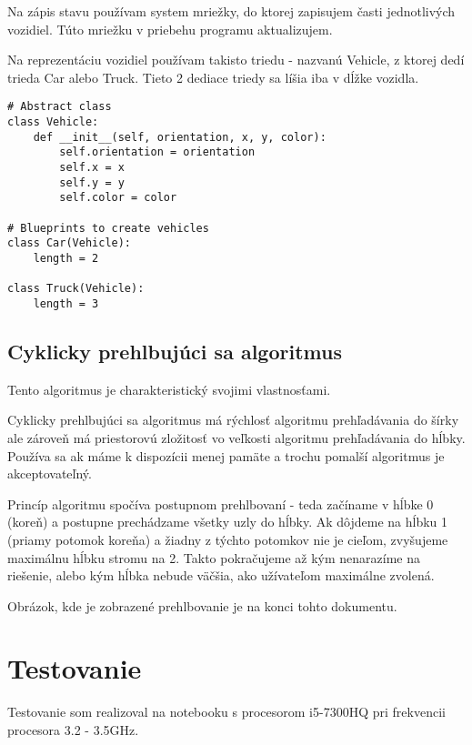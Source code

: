 \documentclass[10pt,oneside,slovak,a4paper]{article}
\begin{document}
Na zápis stavu používam system mriežky, do ktorej zapisujem časti jednotlivých vozidiel. Túto mriežku v priebehu programu aktualizujem.

\medskip

Na reprezentáciu vozidiel používam takisto triedu - nazvanú Vehicle, z ktorej dedí trieda Car alebo Truck. Tieto 2 dediace triedy sa líšia iba v dĺžke vozidla.

\begin{lstlisting}
# Abstract class
class Vehicle:
    def __init__(self, orientation, x, y, color):
        self.orientation = orientation
        self.x = x
        self.y = y
        self.color = color

# Blueprints to create vehicles
class Car(Vehicle):
    length = 2

class Truck(Vehicle):
    length = 3
\end{lstlisting}


\subsection{Cyklicky prehlbujúci sa algoritmus}

Tento algoritmus je charakteristický svojimi vlastnosťami.


Cyklicky prehlbujúci sa algoritmus má rýchlosť algoritmu prehľadávania do šírky ale zároveň má priestorovú zložitosť vo veľkosti algoritmu prehľadávania do hĺbky.
Používa sa ak máme k dispozícii menej pamäte a trochu pomalší algoritmus je akceptovateľný.

\medskip

Princíp algoritmu spočíva postupnom prehlbovaní - teda začíname v hĺbke 0 (koreň) a postupne prechádzame všetky uzly do hĺbky. Ak dôjdeme na hĺbku 1 (priamy potomok koreňa) a žiadny z týchto potomkov nie je cieľom, zvyšujeme maximálnu hĺbku stromu na 2. Takto pokračujeme až kým nenarazíme na riešenie, alebo kým hĺbka nebude väčšia, ako užívateľom maximálne zvolená.

\medskip 

Obrázok, kde je zobrazené prehlbovanie je na konci tohto dokumentu.





\section{Testovanie}
Testovanie som realizoval na notebooku s procesorom i5-7300HQ pri frekvencii procesora 3.2 - 3.5GHz.
\end{document}

